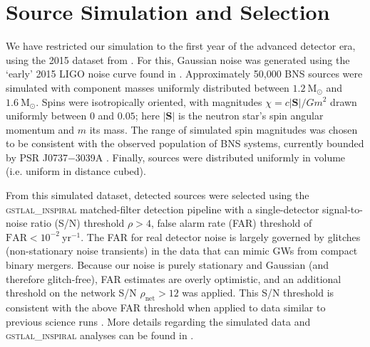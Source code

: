 \section{Source Simulation and Selection}

We have restricted our simulation to the first year of the advanced detector era, using the 2015 dataset from \citet{Singer_2014}.  For this, Gaussian noise was generated using the `early' 2015 LIGO noise curve found in \citet{Barsotti:2012}.  Approximately 50,000 BNS sources were simulated with component masses uniformly distributed between $1.2~\mathrm{M}_\odot$ and $1.6~\mathrm{M}_\odot$.  Spins were isotropically oriented, with magnitudes $\chi = c |\mathbf{S}|/G m^2$ drawn uniformly between $0$ and $0.05$; here $|\mathbf{S}|$ is the neutron star's spin angular momentum and $m$ its mass.  The range of simulated spin magnitudes was chosen to be consistent with the observed population of BNS systems, currently bounded by PSR J0737$-$3039A \citep{Burgay_2003,Brown_2012}.  Finally, sources were distributed uniformly in volume (i.e. uniform in distance cubed).

From this simulated dataset, detected sources were selected using the \textsc{gstlal\_inspiral} matched-filter detection pipeline \citep{Cannon_2012} with a single-detector signal-to-noise ratio (S/N) threshold $\rho>4$, false alarm rate (FAR) threshold of $\mathrm{FAR}<10^{-2}~\mathrm{yr}^{-1}$.  The FAR for real detector noise is largely governed by glitches (non-stationary noise transients) in the data that can mimic GWs from compact binary mergers.  Because our noise is purely stationary and Gaussian (and therefore glitch-free), FAR estimates are overly optimistic, and an additional threshold on the network S/N $\rho_\mathrm{net} > 12$ was applied.  This S/N threshold is consistent with the above FAR threshold when applied to data similar to previous science runs \cite{2013arXiv1304.0670L,Berry_2014}.  More details regarding the simulated data and \textsc{gstlal\_inspiral} analyses can be found in \citet{Singer_2014}.